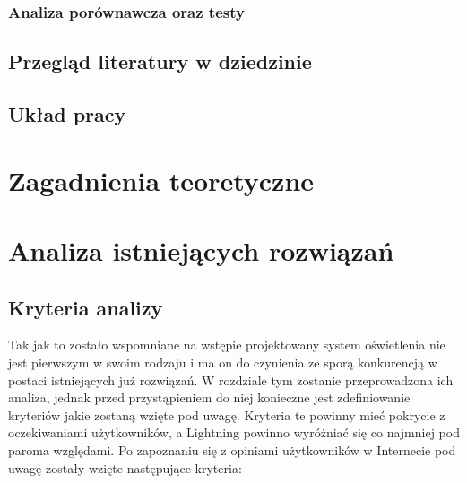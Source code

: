 \documentclass[12pt]{report}
\begin{document}
\subsection{Analiza porównawcza oraz testy}


\section{Przegląd literatury w dziedzinie}


\section{Układ pracy}


\chapter[Zagadnienia teoretyczne]{Zagadnienia teoretyczne}


\chapter[Analiza istniejących rozwiązań]{Analiza istniejących rozwiązań}

\section{Kryteria analizy}

Tak jak to zostało wspomniane na wstępie projektowany system oświetlenia nie jest pierwszym w swoim rodzaju i ma on do czynienia ze sporą konkurencją w postaci istniejących już rozwiązań. W rozdziale tym zostanie przeprowadzona ich analiza, jednak przed przystąpieniem do niej konieczne jest zdefiniowanie kryteriów jakie zostaną wzięte pod uwagę. Kryteria te powinny mieć pokrycie z oczekiwaniami użytkowników, a Lightning powinno wyróżniać się co najmniej pod paroma względami. Po zapoznaniu się z opiniami użytkowników w Internecie pod uwagę zostały wzięte następujące kryteria:
\end{document}
